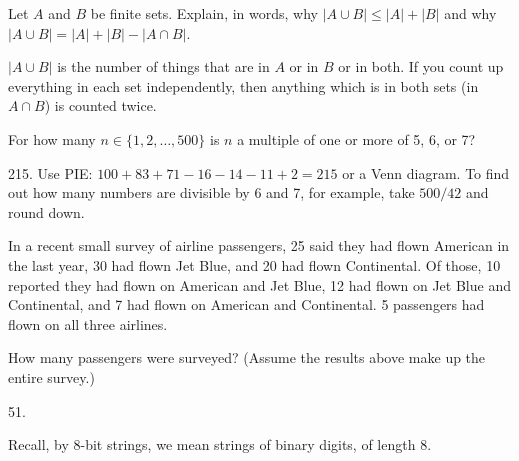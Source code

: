 \begin{squestions}
	
	
\question Let $A$ and $B$ be finite sets.  Explain, in words, why $|A \cup B| \le |A| + |B|$ and why $|A \cup B| = |A| + |B| - |A \cap B|$.

	\begin{answer}
		$|A \cup B|$ is the number of things that are in $A$ or in $B$ or in both.  If you count up everything in each set independently, then anything which is in both sets (in $A \cap B$) is counted twice.
	\end{answer}
	
	
	
\question For how many $n \in \{1,2, \ldots, 500\}$ is $n$ a multiple of one or more of 5, 6, or 7?

	\begin{answer}
		215.  Use PIE: $100 + 83 + 71 - 16 - 14 -11 + 2 = 215$ or a Venn diagram.  To find out how many numbers are divisible by 6 and 7, for example, take $500/42$ and round down.
	\end{answer}
	
	


\question In a recent small survey of airline passengers, 25 said they had flown American in the last year, 30 had flown Jet Blue, and 20 had flown Continental.  Of those, 10 reported they had flown on American and Jet Blue, 12 had flown on Jet Blue and Continental, and 7 had flown on American and Continental.  5 passengers had flown on all three airlines. 

How many passengers were surveyed?  (Assume the results above make up the entire survey.)

	\begin{answer}
		51.
	\end{answer}
	
	


	

\question Recall, by $8$-bit strings, we mean strings of binary digits, of length 8.
\end{squestions}
